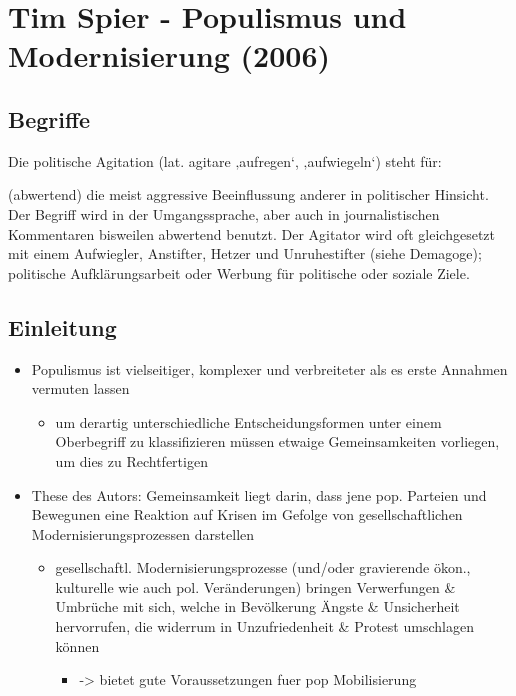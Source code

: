 \documentclass[11pt]{article}
\date{\today}
\title{}
\begin{document}
\tableofcontents

\section{Tim Spier - Populismus und Modernisierung (2006)}
\label{sec:org43d9d97}
\subsection{Begriffe}
\label{sec:orge960fef}
Die politische Agitation (lat. agitare ‚aufregen‘, ‚aufwiegeln‘) steht für:

(abwertend) die meist aggressive Beeinflussung anderer in politischer Hinsicht. Der Begriff wird in der Umgangssprache, aber auch in journalistischen Kommentaren bisweilen abwertend benutzt. Der Agitator wird oft gleichgesetzt mit einem Aufwiegler, Anstifter, Hetzer und Unruhestifter (siehe Demagoge);
politische Aufklärungsarbeit oder Werbung für politische oder soziale Ziele.
\subsection{Einleitung}
\label{sec:org315f793}
\begin{itemize}
\item Populismus ist vielseitiger, komplexer und verbreiteter als es erste Annahmen vermuten lassen
\begin{itemize}
\item um derartig unterschiedliche Entscheidungsformen unter einem Oberbegriff zu klassifizieren müssen etwaige Gemeinsamkeiten vorliegen, um dies zu Rechtfertigen
\end{itemize}
\item These des Autors: Gemeinsamkeit liegt darin, dass jene pop. Parteien und Bewegunen eine Reaktion auf Krisen im Gefolge  von gesellschaftlichen Modernisierungsprozessen darstellen
\begin{itemize}
\item gesellschaftl. Modernisierungsprozesse (und/oder gravierende ökon., kulturelle wie auch pol. Veränderungen) bringen Verwerfungen \& Umbrüche mit sich, welche in Bevölkerung Ängste \& Unsicherheit hervorrufen, die widerrum in Unzufriedenheit \& Protest umschlagen können
\begin{itemize}
\item -> bietet gute Voraussetzungen fuer pop Mobilisierung
\end{itemize}
\end{itemize}
\end{itemize}
\end{document}
